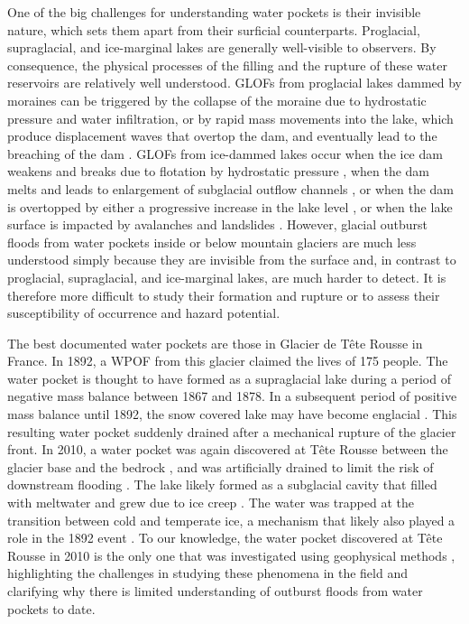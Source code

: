 One of the big challenges for understanding water pockets is their invisible nature, which sets them apart from their surficial counterparts. Proglacial, supraglacial, and ice-marginal lakes are generally well-visible to observers. By consequence, the physical processes of the filling and the rupture of these water reservoirs are relatively well understood. GLOFs from proglacial lakes dammed by moraines can be triggered by the collapse of the moraine due to hydrostatic pressure and water infiltration, or by rapid mass movements into the lake, which produce displacement waves that overtop the dam, and eventually lead to the breaching of the dam \citep{Neupane&al2019}. GLOFs from ice-dammed lakes occur when the ice dam weakens and breaks due to flotation by hydrostatic pressure \citep[e.g.][]{Bjornsson2010}, when the dam melts and leads to enlargement of subglacial outflow channels \citep{Nye1976}, or when the dam is overtopped by either a progressive increase in the lake level \citep[e.g.][]{Raymond&Nolan2000, Ogier&al2021}, or when the lake surface is impacted by avalanches and landslides \citep[e.g.][]{Haeberli1983, Clague&Evans2000}. However, glacial outburst floods from water pockets inside or below mountain glaciers are much less understood simply because they are invisible from the surface and, in contrast to proglacial, supraglacial, and ice-marginal lakes, are much harder to detect. It is therefore more difficult to study their formation and rupture or to assess their susceptibility of occurrence and hazard potential.

The best documented water pockets are those in Glacier de Tête Rousse in France. In 1892, a WPOF from this glacier claimed the lives of 175 people. The water pocket is thought to have formed as a supraglacial lake during a period of negative mass balance between 1867 and 1878. In a subsequent period of positive mass balance until 1892, the snow covered lake may have become englacial \citep{Vincent&al2010b}. This resulting  water pocket suddenly drained after a mechanical rupture of the glacier front. In 2010, a water pocket was again discovered at Tête Rousse between the glacier base and the bedrock \citep{Vincent&al2012,Legchenko&2014,Garambois&al2016}, and was artificially drained to limit the risk of downstream flooding \citep{Vincent&al2012}. The lake likely formed as a subglacial cavity that filled with meltwater and grew due to ice creep \citep{Vincent&al2015}. The water was trapped at the transition between cold and temperate ice, a mechanism that likely also played a role in the 1892 event \citep{Gilbert&al2012}. To our knowledge, the water pocket discovered at Tête Rousse in 2010 is the only one that was investigated using geophysical methods \citep{Vincent&al2012, Legchenko&2014}, highlighting the challenges in studying these phenomena in the field and clarifying why there is limited understanding of outburst floods from water pockets to date. 

